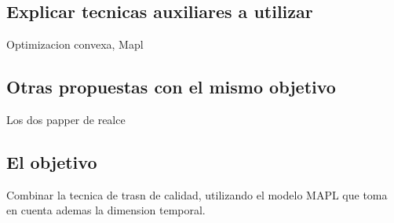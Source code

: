 \documentclass[a4paper,10pt]{article}
\begin{document}
\subsection{Explicar tecnicas auxiliares a utilizar}
Optimizacion convexa, Mapl

\subsection{Otras propuestas con el mismo objetivo}
Los dos papper de realce

\subsection{El objetivo}
Combinar la tecnica de trasn de calidad, utilizando el modelo MAPL que toma en 
cuenta ademas la dimension temporal. 





\clearpage


\end{document}
